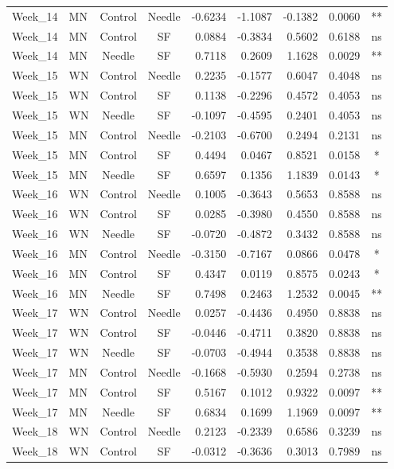 \documentclass[
  12pt,
  letterpaper,
]{article}
\begin{document}
\begin{longtable}{llccrrrlc}
Week\_14 & MN & Control & Needle & -0.6234 & -1.1087 & -0.1382 & 0.0060 & ** \\ 
Week\_14 & MN & Control & SF & 0.0884 & -0.3834 & 0.5602 & 0.6188 & ns \\ 
Week\_14 & MN & Needle & SF & 0.7118 & 0.2609 & 1.1628 & 0.0029 & ** \\ 
Week\_15 & WN & Control & Needle & 0.2235 & -0.1577 & 0.6047 & 0.4048 & ns \\ 
Week\_15 & WN & Control & SF & 0.1138 & -0.2296 & 0.4572 & 0.4053 & ns \\ 
Week\_15 & WN & Needle & SF & -0.1097 & -0.4595 & 0.2401 & 0.4053 & ns \\ 
Week\_15 & MN & Control & Needle & -0.2103 & -0.6700 & 0.2494 & 0.2131 & ns \\ 
Week\_15 & MN & Control & SF & 0.4494 & 0.0467 & 0.8521 & 0.0158 & * \\ 
Week\_15 & MN & Needle & SF & 0.6597 & 0.1356 & 1.1839 & 0.0143 & * \\ 
Week\_16 & WN & Control & Needle & 0.1005 & -0.3643 & 0.5653 & 0.8588 & ns \\ 
Week\_16 & WN & Control & SF & 0.0285 & -0.3980 & 0.4550 & 0.8588 & ns \\ 
Week\_16 & WN & Needle & SF & -0.0720 & -0.4872 & 0.3432 & 0.8588 & ns \\ 
Week\_16 & MN & Control & Needle & -0.3150 & -0.7167 & 0.0866 & 0.0478 & * \\ 
Week\_16 & MN & Control & SF & 0.4347 & 0.0119 & 0.8575 & 0.0243 & * \\ 
Week\_16 & MN & Needle & SF & 0.7498 & 0.2463 & 1.2532 & 0.0045 & ** \\ 
Week\_17 & WN & Control & Needle & 0.0257 & -0.4436 & 0.4950 & 0.8838 & ns \\ 
Week\_17 & WN & Control & SF & -0.0446 & -0.4711 & 0.3820 & 0.8838 & ns \\ 
Week\_17 & WN & Needle & SF & -0.0703 & -0.4944 & 0.3538 & 0.8838 & ns \\ 
Week\_17 & MN & Control & Needle & -0.1668 & -0.5930 & 0.2594 & 0.2738 & ns \\ 
Week\_17 & MN & Control & SF & 0.5167 & 0.1012 & 0.9322 & 0.0097 & ** \\ 
Week\_17 & MN & Needle & SF & 0.6834 & 0.1699 & 1.1969 & 0.0097 & ** \\ 
Week\_18 & WN & Control & Needle & 0.2123 & -0.2339 & 0.6586 & 0.3239 & ns \\ 
Week\_18 & WN & Control & SF & -0.0312 & -0.3636 & 0.3013 & 0.7989 & ns \\ 

\end{longtable}
\end{document}
